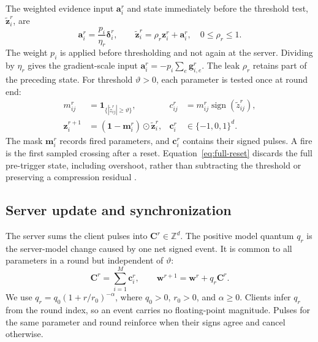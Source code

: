 \documentclass[conference]{IEEEtran}
\newcommand{\ind}[1]{\mathbf{1}_{\{#1\}}}
\newcommand{\vect}[1]{\boldsymbol{#1}}
\newcommand{\newrev}[1]{#1}
\newcommand{\spacerev}[1]{#1}
\begin{document}
The weighted evidence input $\vect{a}_i^r$ and state
immediately before the threshold test, $\widetilde{\vect{z}}_i^r$, are
\begin{equation}
 \vect{a}_i^r=\frac{p_i}{\eta_r}\vect{\delta}_i^r,
 \qquad
 \widetilde{\vect{z}}_i^r=\rho_r\vect{z}_i^r+\vect{a}_i^r,
 \quad 0\leq\rho_r\leq1 .
 \label{eq:evidence-update}
\end{equation}
\spacerev{The weight $p_i$ is applied before thresholding and not again at the
server. Dividing by $\eta_r$ gives the gradient-scale input
$\vect{a}_i^r=-p_i\sum_e\vect{g}_{i,e}^r$. The leak $\rho_r$ retains part of the
preceding state. For threshold $\vartheta>0$, each parameter is tested once at
round end:}
\vspace{-2pt}
\begin{align}
 m_{ij}^r&=\ind{|\widetilde z_{ij}^r|\geq\vartheta},
 &c_{ij}^r&=m_{ij}^r\operatorname{sign}(\widetilde z_{ij}^r),
 \label{eq:event-pulse}\\
 \vect{z}_i^{r+1}&=(\vect{1}-\vect{m}_i^r)\odot
 \widetilde{\vect{z}}_i^r,
 &\vect{c}_i^r&\in\{-1,0,1\}^d .
 \label{eq:full-reset}
\end{align}
\vspace{-2pt}
\spacerev{The mask $\vect{m}_i^r$ records fired parameters, and
$\vect{c}_i^r$ contains their signed pulses. A fire is the first sampled
crossing after a reset. Equation~\eqref{eq:full-reset} discards the full
pre-trigger state, including overshoot, rather than subtracting the threshold
or preserving a compression residual
\cite{stich2018memory,strom2015distributed}.}

\vspace{-3pt}
\subsection{Server update and synchronization}

The server sums the client pulses into $\vect{C}^r\in\mathbb{Z}^d$. The positive
model quantum $q_r$ is the server-model change caused by one net signed event.
It is common to all \newrev{parameters} in a round but independent of $\vartheta$:
\vspace{-2pt}
\begin{equation}
 \vect{C}^r=\sum_{i=1}^M\vect{c}_i^r,
 \qquad
 \vect{w}^{r+1}=\vect{w}^r+q_r\vect{C}^r .
 \label{eq:server-update}
\end{equation}
\vspace{-2pt}
\spacerev{We use $q_r=q_0(1+r/r_0)^{-\alpha}$, where $q_0>0$, $r_0>0$, and
$\alpha\geq0$. Clients infer $q_r$ from the round index, so an event carries no
floating-point magnitude. Pulses for the same parameter and round reinforce
when their signs agree and cancel otherwise.}
\end{document}
